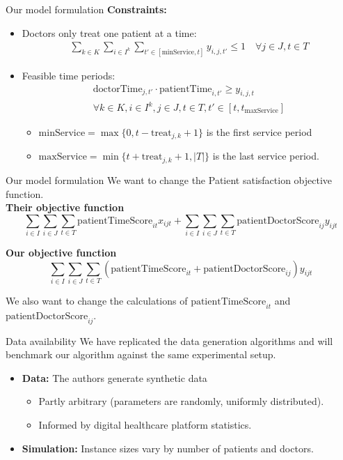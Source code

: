 \documentclass{beamer}
\begin{document}
\begin{frame}{Our model formulation}
\textbf{Constraints:}    
\begin{itemize}
    \item Doctors only treat one patient at a time:
     \begin{gather*}
         \sum_{k\in K} \sum_{i\in I^k} \sum_{t' \in [\textrm{minService}, t]} y_{i, j, t'}  \le 1 \quad \forall j \in J, t\in T
     \end{gather*} 
     \item Feasible time periods:
     \begin{gather*}
          \mathrm{doctorTime}_{j, t'} \cdot \mathrm{patientTime}_{i, t'} \geq y_{i, j, t} \\
          \forall k \in K, i \in I^k, j \in J, t \in T, t' \in [t, t_{\textrm{maxService}}]
     \end{gather*}
     \begin{itemize}
         \item $\textrm{minService} = \max\{0, t - \mathrm{treat}_{j, k}+1\}$ is the first service period 
         \item $\textrm{maxService} = \min\{t + \mathrm{treat}_{j, k} + 1, |T|\}$ is the last service period.
     \end{itemize}
\end{itemize}
\end{frame}


\begin{frame}{Our model formulation}
We want to change the Patient satisfaction objective function. \\
\vspace{1em}
\textbf{Their objective function}
$$ \sum_{i\in I} \sum_{i\in J} \sum_{t\in T} \text{patientTimeScore}_{it} x_{ijt} + \sum_{i\in I} \sum_{i\in J} \sum_{t\in T} \text{patientDoctorScore}_{ij} y_{ijt}$$

\textbf{Our objective function}
$$ \sum_{i\in I} \sum_{i\in J} \sum_{t\in T} (\text{patientTimeScore}_{it} +\text{patientDoctorScore}_{ij}) y_{ijt}$$

We also want to change the calculations of $\text{patientTimeScore}_{it}$ and $\text{patientDoctorScore}_{ij}$.
\end{frame}

\begin{frame}{Data availability}
We have replicated the data generation algorithms and will benchmark our algorithm against the same experimental setup.
\begin{itemize}
    \item \textbf{Data:} The authors generate synthetic data
      \begin{itemize}
        \item Partly arbitrary (parameters are randomly, uniformly distributed).
        \item Informed by digital healthcare platform statistics.
      \end{itemize}
    \item \textbf{Simulation:} Instance sizes vary by number of patients and doctors.
  \end{itemize}
\end{frame}
\end{document}
